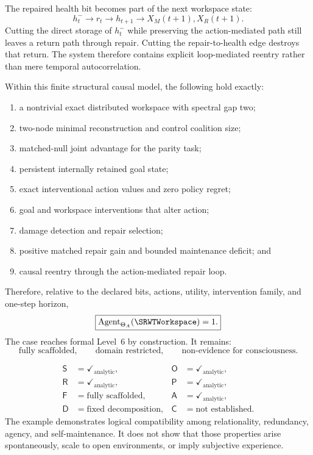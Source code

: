
The repaired health bit becomes part of the next workspace state:
\[
h_t^-
\longrightarrow
r_t
\longrightarrow
h_{t+1}
\longrightarrow
X_M(t+1),X_R(t+1).
\]
Cutting the direct storage of \(h_t^-\) while preserving the action-mediated
path still leaves a return path through repair. Cutting the repair-to-health
edge destroys that return. The system therefore contains explicit
loop-mediated reentry rather than mere temporal autocorrelation.


Within this finite structural causal model, the following hold exactly:
\begin{enumerate}
\item a nontrivial exact distributed workspace with spectral gap two;
\item two-node minimal reconstruction and control coalition size;
\item matched-null joint advantage for the parity task;
\item persistent internally retained goal state;
\item exact interventional action values and zero policy regret;
\item goal and workspace interventions that alter action;
\item damage detection and repair selection;
\item positive matched repair gain and bounded maintenance deficit; and
\item causal reentry through the action-mediated repair loop.
\end{enumerate}
Therefore, relative to the declared bits, actions, utility, intervention family,
and one-step horizon,
\[
\boxed{
\operatorname{Agent}_{\Theta_A}(\SRWTWorkspace)=1.
}
\]
The case reaches formal Level~6 by construction. It remains:
\[
\text{fully scaffolded},
\qquad
\text{domain restricted},
\qquad
\text{non-evidence for consciousness}.
\]


\[
\boxed{
\begin{aligned}
\mathsf S&=\checkmark_{\mathrm{analytic}},
&\mathsf O&=\checkmark_{\mathrm{analytic}},\\
\mathsf R&=\checkmark_{\mathrm{analytic}},
&\mathsf P&=\checkmark_{\mathrm{analytic}},\\
\mathsf F&=\text{fully scaffolded},
&\mathsf A&=\checkmark_{\mathrm{analytic}},\\
\mathsf D&=\text{fixed decomposition},
&\mathsf C&=\text{not established}.
\end{aligned}
}
\]
The example demonstrates logical compatibility among relationality, redundancy,
agency, and self-maintenance. It does not show that those properties arise
spontaneously, scale to open environments, or imply subjective experience.

